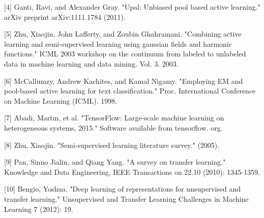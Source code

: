 \documentclass{article}
\begin{document}
[4] Ganti, Ravi, and Alexander Gray. "Upal: Unbiased pool based active learning." arXiv preprint arXiv:1111.1784 (2011).

[5] Zhu, Xiaojin, John Lafferty, and Zoubin Ghahramani. "Combining active learning and semi-supervised learning using gaussian fields and harmonic functions." ICML 2003 workshop on the continuum from labeled to unlabeled data in machine learning and data mining. Vol. 3. 2003.

[6] McCallumzy, Andrew Kachites, and Kamal Nigamy. "Employing EM and pool-based active learning for text classification." Proc. International Conference on Machine Learning (ICML). 1998.

[7] Abadi, Martın, et al. "TensorFlow: Large-scale machine learning on heterogeneous systems, 2015." Software available from tensorflow. org.

[8] Zhu, Xiaojin. "Semi-supervised learning literature survey." (2005).

[9] Pan, Sinno Jialin, and Qiang Yang. "A survey on transfer learning." Knowledge and Data Engineering, IEEE Transactions on 22.10 (2010): 1345-1359.

[10] Bengio, Yoshua. "Deep learning of representations for unsupervised and transfer learning." Unsupervised and Transfer Learning Challenges in Machine Learning 7 (2012): 19.
\end{document}
